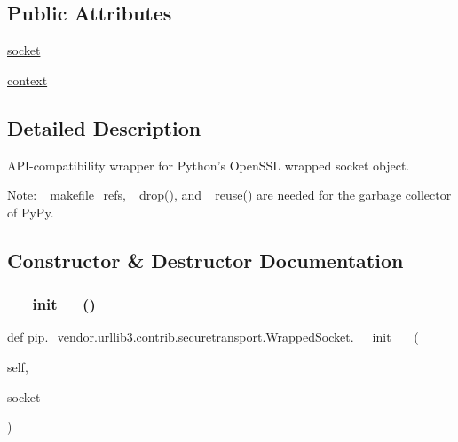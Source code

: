 \subsection*{Public Attributes}
\begin{DoxyCompactItemize}
\item 
\hyperlink{classpip_1_1__vendor_1_1urllib3_1_1contrib_1_1securetransport_1_1WrappedSocket_a96b68596ff2c3a48383878791990c8b0}{socket}
\item 
\hyperlink{classpip_1_1__vendor_1_1urllib3_1_1contrib_1_1securetransport_1_1WrappedSocket_a94527c72d432763c05a0793276484b4e}{context}
\end{DoxyCompactItemize}


\subsection{Detailed Description}
\begin{DoxyVerb}API-compatibility wrapper for Python's OpenSSL wrapped socket object.

Note: _makefile_refs, _drop(), and _reuse() are needed for the garbage
collector of PyPy.
\end{DoxyVerb}
 

\subsection{Constructor \& Destructor Documentation}
\mbox{\label{classpip_1_1__vendor_1_1urllib3_1_1contrib_1_1securetransport_1_1WrappedSocket_ade08d00a9773eda7ed4a3c47fe315a33}} 
\subsubsection{\texorpdfstring{\+\_\+\+\_\+init\+\_\+\+\_\+()}{\_\_init\_\_()}}
{\footnotesize\ttfamily def pip.\+\_\+vendor.\+urllib3.\+contrib.\+securetransport.\+Wrapped\+Socket.\+\_\+\+\_\+init\+\_\+\+\_\+ (\begin{DoxyParamCaption}\item[{}]{self,  }\item[{}]{socket }\end{DoxyParamCaption})}



